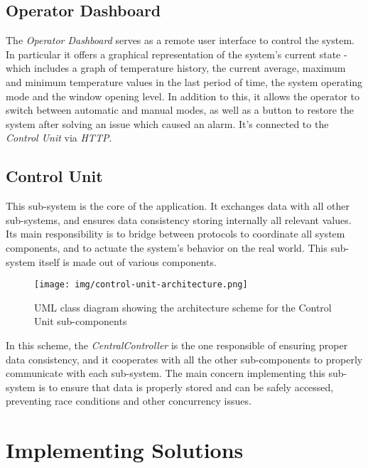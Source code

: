 \documentclass[a4paper,12pt]{report}
\begin{document}
	\section{Operator Dashboard}
	The \textit{Operator Dashboard} serves as a remote user interface to control the system. In particular it offers a graphical representation of the system's current state - which includes a graph of temperature history, the current average, maximum and minimum temperature values in the last period of time, the system operating mode and the window opening level. In addition to this, it allows the operator to switch between automatic and manual modes, as well as a button to restore the system after solving an issue which caused an alarm. It's connected to the \textit{Control Unit} via \textit{HTTP}.
	\section{Control Unit}
	This sub-system is the core of the application. It exchanges data with all other sub-systems, and ensures data consistency storing internally all relevant values. Its main responsibility is to bridge between protocols to coordinate all system components, and to actuate the system's behavior on the real world.
	\newline This sub-system itself is made out of various components.
	\begin{figure}[H]
		\centering{}
		\texttt{[image: img/control-unit-architecture.png]}
		\caption{UML class diagram showing the architecture scheme for the Control Unit sub-components}
		\label{img:control-unit-architecture}
	\end{figure}
	In this scheme, the \textit{CentralController} is the one responsible of ensuring proper data consistency, and it cooperates with all the other sub-components to properly communicate with each sub-system.
	\newline The main concern implementing this sub-system is to ensure that data is properly stored and can be safely accessed, preventing race conditions and other concurrency issues.
	
	\chapter{Implementing Solutions}
\end{document}
